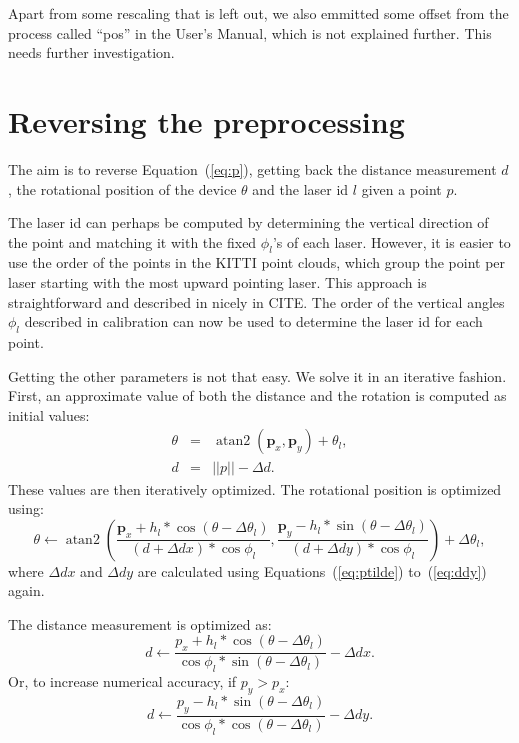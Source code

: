 \documentclass[english]{article}
\DeclareMathOperator*{\atantwo}{atan2}
\begin{document}
Apart from some rescaling that is left out, we also emmitted some offset
from the process called ``pos'' in the User's Manual, which is not
explained further. This needs further investigation.


\section{Reversing the preprocessing}
The aim is to reverse Equation~(\ref{eq:p}), getting back the distance
measurement $d$, the rotational position of the device $\theta$ and the
laser id $l$ given a point $p$.

The laser id can perhaps be computed by determining the vertical
direction of the point and matching it with the fixed $\phi_l$'s of each
laser. However, it is easier to use the order of the points in the KITTI
point clouds, which group the point per laser starting with the most
upward pointing laser. This approach is straightforward and described in nicely
in CITE. The order of the vertical angles $\phi_l$ described in calibration
can now be used to determine the laser id for each point.

Getting the other parameters is not that easy. We solve it in
an iterative fashion. First, an approximate value of both the distance and
the rotation is computed as initial values:
\begin{eqnarray}
  \theta &=& \atantwo(\mathbf{p}_x, \mathbf{p}_y) + \theta_l, \\
  d &=& ||p|| - \Delta d.
\end{eqnarray}
These values are then iteratively optimized. The rotational position is optimized using:
\begin{equation}
   \theta \leftarrow \atantwo\left(
                     \frac{\mathbf{p}_x + h_l * \cos(\theta - \Delta \theta_l)}{(d + \Delta dx) * \cos{\phi_l}},
                     \frac{\mathbf{p}_y - h_l * \sin(\theta - \Delta \theta_l)}{(d + \Delta dy) * \cos{\phi_l}}
           \right) + \Delta \theta_l,
   \label{eq:thetait}
\end{equation}
where $\Delta dx$ and $\Delta dy$ are calculated using
Equations~(\ref{eq:ptilde}) to~(\ref{eq:ddy}) again.

The distance measurement is optimized as:
\begin{equation}
    d \leftarrow \frac{p_x + h_l * \cos(\theta - \Delta \theta_l)}{\cos{\phi_l} * \sin(\theta - \Delta \theta_l)} - \Delta dx.  \label{eq:dita}
\end{equation}
Or, to increase numerical accuracy, if $p_y > p_x$:
\begin{equation}
    d \leftarrow \frac{p_y - h_l * \sin(\theta - \Delta \theta_l)}{\cos{\phi_l} * \cos(\theta - \Delta \theta_l)} - \Delta dy.  \label{eq:ditb}
\end{equation}
\end{document}
